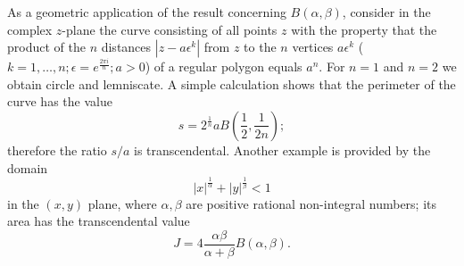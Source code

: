 As a geometric application of the result concerning $B(\alpha, \beta)$, consider in the complex $z$-plane the curve consisting of all points $z$ with the property that the product of the $n$ distances $|z - a \epsilon^k|$ from $z$ to the $n$ vertices $a \epsilon^k$ ($k=1, \dots, n; \epsilon = e^{\frac{2\pi i}{n}}; a > 0$) of a regular polygon equals $a^n$. For $n=1$ and $n=2$ we obtain circle and lemniscate. A simple calculation shows that the perimeter of the curve has the value
\[
s = 2^{\frac{1}{n}} a B\left(\frac{1}{2}, \frac{1}{2n}\right);
\]
therefore the ratio $s/a$ is transcendental. Another example is provided by the domain
\[
|x|^{\frac{1}{\alpha}} + |y|^{\frac{1}{\beta}} < 1
\]
in the $(x,y)$ plane, where $\alpha, \beta$ are positive rational non-integral numbers; its area has the transcendental value
\[
J = 4 \frac{\alpha \beta}{\alpha + \beta} B(\alpha, \beta).
\]